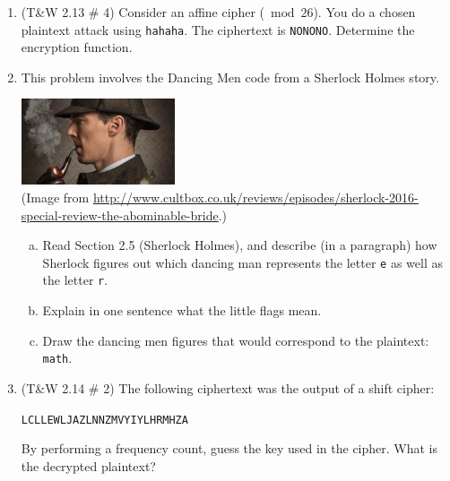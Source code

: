 \documentclass[12pt]{amsart}
\theoremstyle{plain}
\theoremstyle{definition}
\begin{document}
\begin{enumerate}[1.]
	\item (T\&W 2.13 \# 4)  Consider an affine cipher ($\bmod 26$).  You do a chosen plaintext attack using \texttt{hahaha}.  The ciphertext is \texttt{NONONO}.  Determine the encryption function.\\ \begin{framed}\vspace{2in}\end{framed}
	 \newpage  \item This problem involves the Dancing Men code from a Sherlock Holmes story.
		\begin{center}
			\includegraphics[height=1in]{Sherlock.jpg}\\
			\tiny{(Image from \url{http://www.cultbox.co.uk/reviews/episodes/sherlock-2016-special-review-the-abominable-bride}.)}
		\end{center}
		
		\begin{enumerate}[a.]
			\item Read Section 2.5 (Sherlock Holmes), and describe (in a paragraph) how Sherlock figures out which dancing man represents the letter \texttt{e} as well as the letter \texttt{r}.\\ \begin{framed}\vspace{2in}\end{framed}
			\item Explain in one sentence what the little flags mean.\\\begin{framed}\vspace{1in}\end{framed}
			\item Draw the dancing men figures that would correspond to the plaintext: \texttt{math}.\\ \begin{framed}\vspace{1.5in}\end{framed}
		\end{enumerate}
		 \newpage \item (T\&W 2.14 \# 2)  The following ciphertext was the output of a shift cipher:
		\begin{center}
			\texttt{LCLLEWLJAZLNNZMVYIYLHRMHZA}
		\end{center}
		By performing a frequency count, guess the key used in the cipher.  What is the decrypted plaintext?\\ \begin{framed}\vspace{2in}\end{framed}
				

\end{enumerate}
\end{document}
